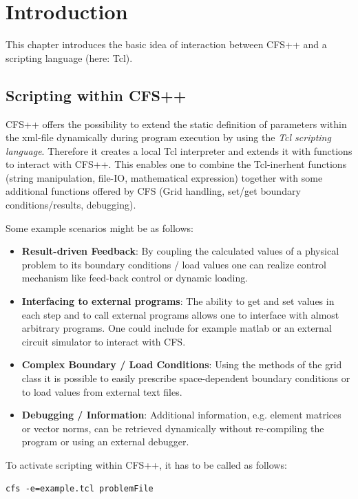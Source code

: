 \chapter{Introduction}
This chapter introduces the basic idea of interaction between CFS++
and a scripting language (here: Tcl).

\section{Scripting within CFS++}
CFS++ offers the possibility to extend the static definition of
parameters within the xml-file dynamically during program execution by
using the {\em Tcl scripting language}. Therefore it creates a local
Tcl interpreter and extends it with functions to interact with CFS++.
This enables one to combine the
Tcl-inerhent functions (string manipulation, file-IO, mathematical
expression) together with some additional functions offered by CFS
(Grid handling, set/get boundary conditions/results, debugging).
\newline

\noindent
Some example scenarios might be as follows:
\begin{itemize}
\item{\bf Result-driven Feedback}: By coupling the calculated values of a
  physical problem to its boundary conditions / load values one can
  realize control mechanism like feed-back control or dynamic loading.
\item {\bf Interfacing to external programs}: The ability to get and
  set values in each step and to call external programs allows one to
  interface with almost arbitrary programs. One could include for
  example matlab or an external circuit simulator to interact with CFS.
\item {\bf Complex Boundary / Load Conditions}: Using the methods of
  the grid class it is possible to easily prescribe space-dependent
  boundary conditions or to load values from external text files.
\item {\bf Debugging / Information}: Additional information,
  e.g. element matrices or vector norms, can be retrieved dynamically
  without re-compiling the program or using an external debugger.
\end{itemize}

To activate scripting within CFS++, it has to be called as follows:
\begin{verbatim}
cfs -e=example.tcl problemFile
\end{verbatim}


